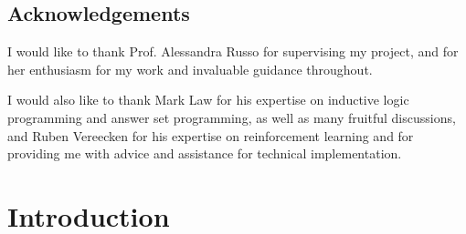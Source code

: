 \documentclass[11pt,twoside]{report}
\date{September 2018}
\theoremstyle{plain}
\theoremstyle{definition}
\let\listoftableandfigures\listoftables
\renewcommand*\listtablename{List of Tables and Figures}
\begin{document}


\clearpage{\pagestyle{empty}\cleardoublepage}
\setcounter{page}{1}
\pagestyle{fancy}


 \begin{abstract}

 \end{abstract}
\cleardoublepage
\section*{Acknowledgements}

I would like to thank Prof. Alessandra Russo for supervising my project, and for her enthusiasm for my work and invaluable guidance throughout.

I would also like to thank Mark Law for his expertise on inductive logic programming and answer set programming,  as well as many fruitful discussions, and  Ruben Vereecken for his expertise on reinforcement learning and for providing me with advice and assistance for technical implementation.

\clearpage{\pagestyle{empty}\cleardoublepage}

\tableofcontents

\clearpage{\pagestyle{empty}\cleardoublepage}
\setcounter{page}{1}
\fancyhead[LE,RO]{\slshape \rightmark}
\fancyhead[LO,RE]{\slshape \leftmark}

\renewcommand\listtablename{List of Figures and Tables}
\listoftableandfigures

 


\chapter{Introduction}
\label{introduction}

\end{document}
